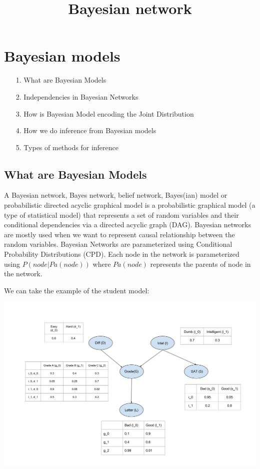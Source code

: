 \documentclass{article}
\title{Bayesian network}
\begin{document}
\maketitle

\section{Bayesian models}

\begin{itemize}
\item[1.] What are Bayesian Models
\item[2.] Independencies in Bayesian Networks
\item[3.] How is Bayesian Model encoding the Joint Distribution
\item[4.] How we do inference from Bayesian models
\item[5.] Types of methods for inference
\end{itemize}

\subsection{What are Bayesian Models}

A Bayesian network, Bayes network, belief network, Bayes(ian) model or probabilistic directed acyclic graphical model is a probabilistic graphical model (a type of statistical model) that represents a set of random variables and their conditional dependencies via a directed acyclic graph (DAG). Bayesian networks are mostly used when we want to represent causal relationship between the random variables. Bayesian Networks are parameterized using Conditional Probability Distributions (CPD). Each node in the network is parameterized using $ P(node | Pa(node)) $ where $ Pa(node) $ represents the parents of node in the network.

We can take the example of the student model:

\includegraphics[width=\linewidth]{imagen1.png}
\end{document}

